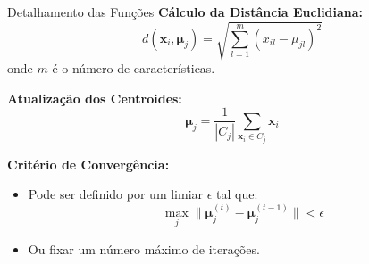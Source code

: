 \documentclass{beamer}
\begin{document}
\begin{frame}[fragile]{Detalhamento das Funções}
    \textbf{Cálculo da Distância Euclidiana:}
    \begin{equation*}
    d(\mathbf{x}_i, \boldsymbol{\mu}_j) = \sqrt{\sum_{l=1}^{m} (x_{il} - \mu_{jl})^2}
    \end{equation*}
    onde \( m \) é o número de características.

    \vspace{0.5cm}

    \textbf{Atualização dos Centroides:}
    \begin{equation*}
    \boldsymbol{\mu}_j = \frac{1}{|C_j|} \sum_{\mathbf{x}_i \in C_j} \mathbf{x}_i
    \end{equation*}

    \vspace{0.5cm}

    \textbf{Critério de Convergência:}
    \begin{itemize}
        \item Pode ser definido por um limiar \( \epsilon \) tal que:
        \[
        \max_j \|\boldsymbol{\mu}_j^{(t)} - \boldsymbol{\mu}_j^{(t-1)}\| < \epsilon
        \]
        \item Ou fixar um número máximo de iterações.
    \end{itemize}
\end{frame}
\end{document}
